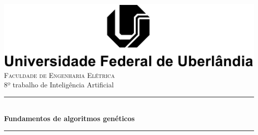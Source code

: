 \documentclass[11pt]{article}
\begin{document}
\begin{titlepage}

\newcommand{\HRule}{\rule{\linewidth}{0.5mm}} %

\center %


\includegraphics[scale=1.2]{ufulogo4}\\[1cm] %
 


\textsc{\Large Faculdade de Engenharia Elétrica}\\[0.6cm] %
{\large 8º trabalho de Inteligência Artificial}\\[0.5cm] %


\HRule \\[0.4cm]
{ \huge \bfseries Fundamentos de algoritmos genéticos}\\[0.4cm] %
\HRule \\[1.5cm]
 


\end{titlepage}
\end{document}
